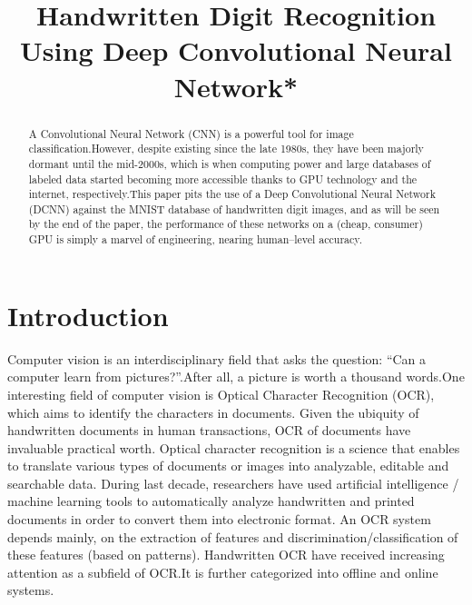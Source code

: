 \documentclass[conference]{IEEEtran}
\begin{document}
\title{Handwritten Digit Recognition Using Deep Convolutional Neural Network*}




\author{

\and


\and

}

\maketitle
\begin{abstract}
    A Convolutional Neural Network (CNN) is a powerful tool for image classification.\@ However, despite existing since the late 1980s, they have been majorly dormant until the mid-2000s, which is when computing power and large databases of labeled data started becoming more accessible thanks to GPU technology and the internet, respectively.\@ This paper pits the use of a Deep Convolutional Neural Network (DCNN) against the MNIST database of handwritten digit images, and as will be seen by the end of the paper, the performance of these networks on a (cheap, consumer) GPU is simply a marvel of engineering, nearing human--level accuracy.
\end{abstract}

\section{Introduction}
Computer vision is an interdisciplinary field that asks the question: ``Can a computer learn from pictures?''.\@ After all, a picture is worth a thousand words.\@ One interesting field of computer vision is Optical Character Recognition (OCR), which aims to identify the characters in documents. Given the ubiquity of handwritten documents in human transactions, OCR of documents have invaluable practical worth. Optical character recognition is a science that enables to translate various types of documents or images into analyzable, editable and searchable data.
During last decade, researchers have used artificial intelligence / machine learning tools to automatically analyze handwritten and printed documents in order to convert them into electronic format.
An OCR system depends mainly, on the extraction of
features and discrimination/classification of these features
(based on patterns). Handwritten OCR have received increasing attention as a subfield of OCR.\@ It is further categorized into offline\cite{article} and online systems\cite{Connell2001}.
\blindtext
\end{document}
